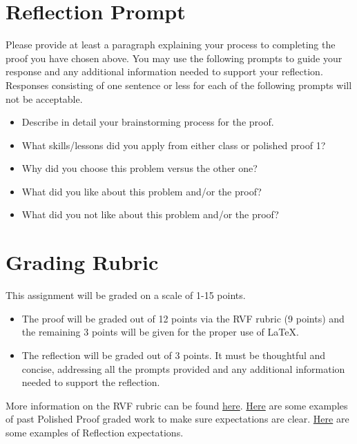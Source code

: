 \documentclass{article}
\theoremstyle{definition}
\begin{document}
\section*{Reflection Prompt}
    Please provide at least a paragraph explaining your process to completing the proof you have chosen above. You may use the following prompts to guide your response and any additional information needed to support your reflection. Responses consisting of one sentence or less for each of the following prompts will not be acceptable.
    \begin{itemize}
        \item Describe in detail your brainstorming process for the proof.
        \item What skills/lessons did you apply from either class or polished proof 1?
        \item Why did you choose this problem versus the other one?
        \item What did you like about this problem and/or the proof?
        \item What did you not like about this problem and/or the proof?
    \end{itemize}

\section*{Grading Rubric}
    This assignment will be graded on a scale of 1-15 points.
    \begin{itemize}
    \item The proof will be graded out of 12 points via the RVF rubric (9 points) and the remaining 3 points will be given for the proper use of \LaTeX.
    \item The reflection will be graded out of 3 points. It must be thoughtful and concise, addressing all the prompts provided and any additional information needed to support the reflection.
    \end{itemize}
     
    More information on the RVF rubric can be found 
    \href{https://drive.google.com/file/d/1P0OBjw-GkX64uCpYcqYmXARapf9MwaiI/view?usp=sharing}{here}. 
    \href{https://drive.google.com/file/d/1KAFQ7GBFpfUkyTBRZ30h5o6nXWwYDSML/view?usp=sharing}{Here} 
    are some examples of past Polished Proof graded work to make sure expectations are clear. \href{https://docs.google.com/document/d/1GcCZI_ueOWXlBC9xIBietOw1uEzFIyg-TzuHvbCZumU/edit?usp=sharing}{Here} are some examples of Reflection expectations.


	
\end{document}
